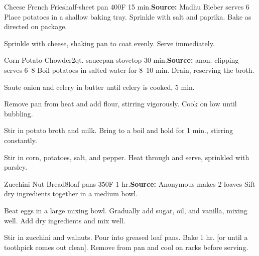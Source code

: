 \begin{recipe}{Cheese French Fries}{half-sheet pan \hfill 400\0F \hfill 15 min.}{\textbf{Source:} Madhu Bieber \hfill serves 6}
 Place potatoes in a shallow baking tray. Sprinkle with salt and paprika. Bake as directed on package.

 Sprinkle with cheese, shaking pan to coat evenly. Serve immediately.
\end{recipe}

\begin{recipe}{Corn \And Potato Chowder}{2qt. saucepan \hfill stovetop \hfill 30 min.}{\textbf{Source:} anon. clipping \hfill serves 6--8}
 Boil potatoes in salted water for 8--10 min. Drain, reserving the broth.

 Saute onion and celery in butter until celery is cooked, 5 min.

 Remove pan from heat and add flour, stirring vigorously. Cook on low until bubbling.

 Stir in potato broth and milk. Bring to a boil and hold for 1 min., stirring constantly.

 Stir in corn, potatoes, salt, and pepper. Heat through and serve, sprinkled with parsley.
\end{recipe}

\begin{recipe}{Zucchini Nut Bread}{8\inch{}\inch loaf pans \hfill 350\0F \hfill 1 hr.}{\textbf{Source:} Anonymous \hfill makes 2 loaves}
 Sift dry ingredients together in a medium bowl.

 Beat eggs in a large mixing bowl. Gradually add sugar, oil, and vanilla, mixing well. Add dry ingredients and mix well.

 Stir in zucchini and walnuts. Pour into greased loaf pans. Bake 1 hr. [or until a toothpick comes out clean]. Remove from pan and cool on racks before serving.
\end{recipe}

